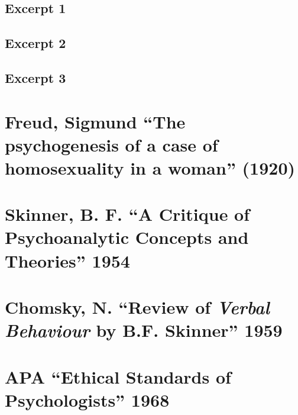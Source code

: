 \begin{refsection}
\begin{appendices}
\subsection{Excerpt 1}
\label{excerpt1}

\label{app: KraftEbbing1}


\subsection{Excerpt 2}
\label{excerpt2}

\label{app: KraftEbbing2}


\subsection{Excerpt 3}
\label{excerpt3}

\label{app: KraftEbbing3}


\section{Freud, Sigmund ``The psychogenesis of a case of homosexuality in a woman'' (1920)}
\label{freudsigmundthepsychogenesisofacaseofhomosexualityinawoman1920}

\label{app: Freud}


\section{Skinner, B. F. ``A Critique of Psychoanalytic Concepts and Theories'' 1954}
\label{skinnerb.f.acritiqueofpsychoanalyticconceptsandtheories1954}

\label{app: Skinner}


\section{Chomsky, N. ``Review of \emph{Verbal Behaviour} by B.F. Skinner'' 1959}
\label{chomskyn.reviewofverbalbehaviourbyb.f.skinner1959}

\label{app: Chomsky}


\section{APA ``Ethical Standards of Psychologists'' 1968}
\label{apaethicalstandardsofpsychologists1968}


\end{appendices}
\end{refsection}
